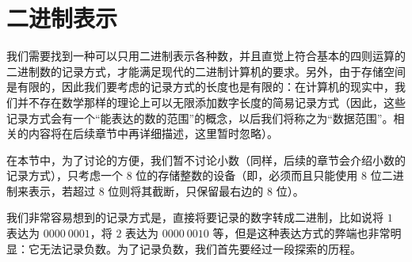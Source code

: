 \section{二进制表示}\label{sec:NumberSystemBasics/BinaryPresentation}
    我们需要找到一种可以只用二进制表示各种数，并且直觉上符合基本的四则运算的二进制数的记录方式，才能满足现代的二进制计算机的要求。另外，由于存储空间是有限的，因此我们要考虑的记录方式的长度也是有限的：在计算机的现实中，我们并不存在数学那样的理论上可以无限添加数字长度的简易记录方式（因此，这些记录方式会有一个“能表达的数的范围”的概念，以后我们将称之为“数据范围”。相关的内容将在后续章节中再详细描述，这里暂时忽略）。

    在本节中，为了讨论的方便，我们暂不讨论小数（同样，后续的章节会介绍小数的记录方式），只考虑一个 $8$ 位的存储整数的设备（即，必须而且只能使用 $8$ 位二进制来表示，若超过 $8$ 位则将其截断，只保留最右边的 $8$ 位）。

    我们非常容易想到的记录方式是，直接将要记录的数字转成二进制，比如说将 $1$ 表达为 $0000\ 0001$，将 $2$ 表达为 $0000\ 0010$ 等，但是这种表达方式的弊端也非常明显：它无法记录负数。为了记录负数，我们首先要经过一段探索的历程。
